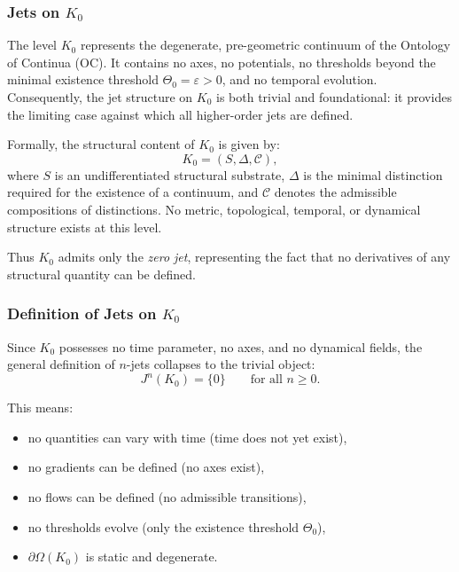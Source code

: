 
\subsubsection{Jets on \texorpdfstring{$K_0$}{K_0}}
\label{sec:jets-k0}

The level $K_0$ represents the degenerate, pre-geometric continuum of the
Ontology of Continua (OC). It contains no axes, no potentials,
no thresholds beyond the minimal existence threshold $\Theta_0=\varepsilon>0$,
and no temporal evolution. Consequently, the jet structure on $K_0$ is
both trivial and foundational: it provides the limiting case against
which all higher-order jets are defined.

\medskip

Formally, the structural content of $K_0$ is given by:
\[
K_0 = (S, \Delta, \mathcal{C}),
\]
where $S$ is an undifferentiated structural substrate,
$\Delta$ is the minimal distinction required for the existence of a
continuum, and $\mathcal{C}$ denotes the admissible compositions of
distinctions. No metric, topological, temporal, or dynamical structure
exists at this level.

Thus $K_0$ admits only the \emph{zero jet}, representing the fact that
no derivatives of any structural quantity can be defined.



\subsubsection{Definition of Jets on \texorpdfstring{\texorpdfstring{$K_0$}{K_0}}{K0}}

Since $K_0$ possesses no time parameter, no axes, and no dynamical fields,
the general definition of $n$-jets collapses to the trivial object:
\[
J^n(K_0) = \{0\}
\qquad \text{for all } n \ge 0.
\]

This means:

\begin{itemize}
    \item no quantities can vary with time (time does not yet exist),
    \item no gradients can be defined (no axes exist),
    \item no flows can be defined (no admissible transitions),
    \item no thresholds evolve (only the existence threshold $\Theta_0$),
    \item $\partial\Omega(K_0)$ is static and degenerate.
\end{itemize}

